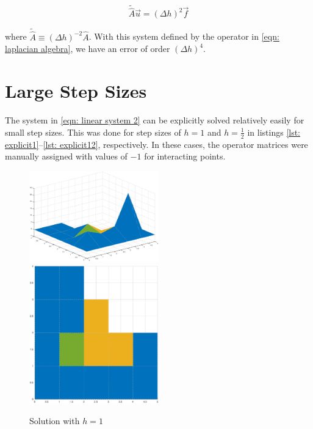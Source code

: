 \documentclass[10pt,a4paper]{article}
\begin{document}
\begin{equation}
\label{eqn: linear system 2}
\tilde{\hat{A}} \vec{u}  = \left( \Delta h \right)^2 \vec{f}
\end{equation}

 where $\tilde{\hat{A}} \equiv \left( \Delta h \right)^{-2} \hat{A}$. With this system defined by the operator in \cref{eqn: laplacian algebra}, we have an error of order $\left( \Delta h \right)^4$.

 \section*{Large Step Sizes}

 
 The system in \cref{eqn: linear system 2} can be explicitly solved relatively easily for small step sizes. This was done for step sizes of $h=1$ and $h = \frac{1}{2}$ in listings \ref{lst: explicit1}--\ref{lst: explicit12}, respectively. In these cases, the operator matrices were manually assigned with values of $-1$ for interacting points.

 \begin{figure}[H]
	 \includegraphics[width=0.5\textwidth]{figures/explicit-h1.eps}
	 \includegraphics[width=0.5\textwidth]{figures/explicit-h1-top.eps}
	 \caption{Solution with $h=1$}
	 \label{fig: explicit1plot}
 \end{figure}
\end{document}
